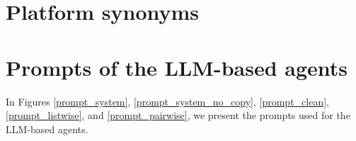 \appendix
\section{Platform synonyms}
\begin{table*}[htbp]
\caption{A glossary of terms used in {\platformName}.}
\centering
\renewcommand{\arraystretch}{1.0}
\resizebox{\textwidth}{!}{

}
\end{table*}
\section{Prompts of the LLM-based agents}\label{appendix_prompts}
In Figures \ref{prompt_system}, \ref{prompt_system_no_copy}, \ref{prompt_clean}, \ref{prompt_listwise}, and \ref{prompt_pairwise}, we present the prompts used for the LLM-based agents.
\begin{figure*}[t]
\centering

\caption{System prompt for LLM-based agents. The system prompt includes instructions for the game and defines the agent's persona.}
\label{prompt_system}
\end{figure*}

\begin{figure*}[t]
\centering

\caption{System prompt for LLM-based agents with additional instruction for not copying as given to students in ranking competition \cite{nachimovsky_ranking-incentivized_2024}. The system prompt includes instructions for the game and defines the agent's persona.}
\label{prompt_system_no_copy}
\end{figure*}

\begin{figure*}[t]
\centering

\caption{Cleaning prompt submitted to the LLM to remove headers and prefixes from the generated text.}
\label{prompt_clean}
\end{figure*}



\begin{figure*}[t]
\centering

\caption{Listwise user prompt used as feedback for an LLM-based agent. This user prompt includes feedback from the last two rounds. The most recent round presents documents from highest to lowest ranking in the group, excluding the current document: a, b, c, d. The second-to-last round presents documents from the entire group, ranked from highest to lowest: e, f, g, h, i.}
\label{prompt_listwise}
\end{figure*}

